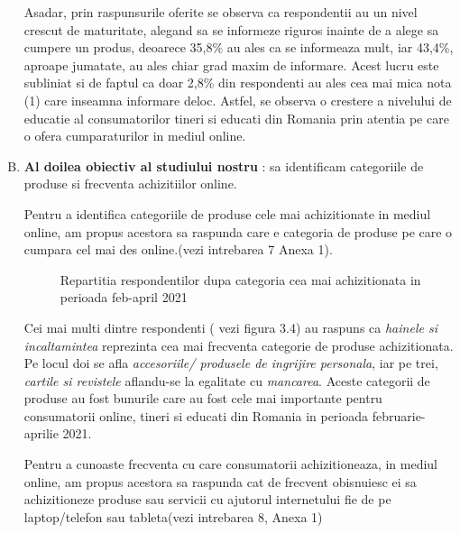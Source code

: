 \documentclass[a4paper, 12pt]{article}
\begin{document}
\begin{enumerate}[(A)]
	 	\qquad Asadar, prin raspunsurile oferite se observa ca respondentii  au un nivel crescut de maturitate, alegand sa se informeze riguros inainte de a alege sa cumpere un produs, deoarece  35,8\% au ales ca se informeaza mult, iar 43,4\%, aproape jumatate, au ales chiar grad maxim de informare. Acest lucru este subliniat si de faptul ca doar 2,8\% din respondenti au ales cea mai mica nota (1) care inseamna informare deloc. Astfel, se observa o crestere a nivelului de educatie al consumatorilor tineri si educati din Romania prin atentia pe care o ofera cumparaturilor in mediul online.

	 	
		\item \textbf{Al doilea obiectiv al studiului nostru }: sa identificam categoriile de produse si frecventa achizitiilor online.
		
		\quad Pentru a identifica categoriile de produse cele mai achizitionate in mediul online, am propus acestora sa raspunda care e categoria de produse pe care o cumpara cel mai des online.(vezi intrebarea 7 Anexa 1).
		\begin{figure}[!htb]
			\centering
			\caption{Repartitia respondentilor dupa categoria cea mai achizitionata in perioada feb-april 2021} 
		\end{figure}
	
		\quad Cei mai multi dintre respondenti ( vezi figura 3.4) au raspuns ca\textit{ hainele si incaltamintea} reprezinta cea mai frecventa categorie de produse achizitionata. Pe locul doi se afla \textit{accesoriile/ produsele de ingrijire personala}, iar pe trei,\textit{ cartile si revistele} aflandu-se la egalitate cu \textit{mancarea}. Aceste categorii de produse au fost bunurile care au fost cele mai importante pentru consumatorii online, tineri si educati din Romania in perioada februarie-aprilie 2021.
	
		\qquad Pentru a cunoaste frecventa  cu care consumatorii achizitioneaza, in mediul  online, am propus acestora sa raspunda cat de frecvent obisnuiesc ei sa achizitioneze produse sau servicii cu ajutorul internetului fie de pe laptop/telefon sau tableta(vezi intrebarea 8, Anexa 1)
		\begin{figure}[!htb]
			\centering
			\begin{tikzpicture}
				

\end{tikzpicture}
\end{figure}
\end{enumerate}
\end{document}
